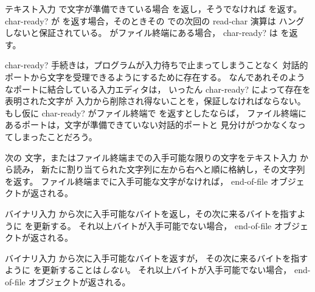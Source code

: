 \begin{entry}{%
}

テキスト入力  で文字が準備できている場合 \schtrue{} を返し，そうでなければ \schfalse{} を返す。
{\cf char-ready?} が \schtrue{} を返す場合，そのときその  での次回の {\cf read-char} 演算は
ハングしないと保証されている。
 がファイル終端にある場合， {\cf char-ready?} は \schtrue を返す。

\begin{rationale}
{\cf char-ready?} 手続きは，プログラムが入力待ちで止まってしまうことなく
対話的ポートから文字を受理できるようにするために存在する。
なんであれそのようなポートに結合している入力エディタは，
いったん {\cf char-ready?} によって存在を表明された文字が
入力から削除され得ないことを，保証しなければならない。
もし仮に {\cf char-ready?} がファイル終端で \schtrue{} を返すとしたならば，
ファイル終端にあるポートは，文字が準備できていない対話的ポートと
見分けがつかなくなってしまったことだろう。
\end{rationale}
\end{entry}

\begin{entry}{%
}
\label{readstring}

次の  文字，またはファイル終端までの入手可能な限りの文字をテキスト入力  から読み，
新たに割り当てられた文字列に左から右へと順に格納し，その文字列を返す。
ファイル終端までに入手可能な文字がなければ， end-of-file オブジェクトが返される。

\end{entry}


\begin{entry}{%
}

バイナリ入力  から次に入手可能なバイトを返し，その次に来るバイトを指すように  を更新する。
それ以上バイトが入手可能でない場合， end-of-file オブジェクトが返される。

\end{entry}

\begin{entry}{%
}

バイナリ入力  から次に入手可能なバイトを返すが，
その次に来るバイトを指すように  を更新することは{\em しない}。
それ以上バイトが入手可能でない場合， end-of-file オブジェクトが返される。

\end{entry}

